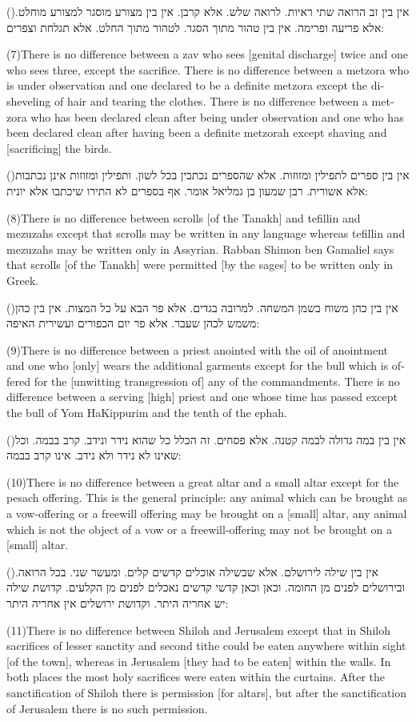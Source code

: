 \documentclass[12pt, openany]{book}
\newcommand{\sethebfont}{
\fontsize{10.5pt}{13.1pt} \selectfont
}
\newcommand{\hebeng}[2]{
	{\sethebfont #1\\}
	
	\begin{english}
		#2
	\end{english}
	\clearpage
}
\newcommand{\vsnum}[1]{(\hebrewnumeral{#1})\space}
\newcommand{\vsnumeng}[1]{(#1)\space}
\begin{document}
\hebeng{\vsnum{7}אין בין זב הרואה שתי ראיות. לרואה שלש. אלא קרבן. אין בין מצורע מוסגר למצורע מוחלט. אלא פריעה ופרימה. אין בין טהור מתוך הסגר. לטהור מתוך החלט. אלא תגלחת וצפרים: 
}{\vsnumeng{7}There is no difference between a zav who sees {[genital discharge]} twice and one who sees three, except the sacrifice. There is no difference between a metzora who is under observation and one declared to be a definite metzora except the disheveling of hair and tearing the clothes. There is no difference between a metzora who has been declared clean after being under observation and one who has been declared clean after having been a definite metzorah except shaving and {[sacrificing]} the birds.}%

\hebeng{\vsnum{8}אין בין ספרים לתפילין ומזוזות. אלא שהספרים נכתבין בכל לשון. ותפילין ומזוזות אינן נכתבות אלא אשורית. רבן שמעון בן גמליאל אומר. אף בספרים לא התירו שיכתבו אלא יונית: 
}{\vsnumeng{8}There is no difference between scrolls {[of the Tanakh]} and tefillin and mezuzahs except that scrolls may be written in any language whereas tefillin and mezuzahs may be written only in Assyrian. Rabban Shimon ben Gamaliel says that scrolls {[of the Tanakh]} were permitted {[by the sages]} to be written only in Greek.}%

\hebeng{\vsnum{9}אין בין כהן משוח בשמן המשחה. למרובה בגדים. אלא פר הבא על כל המצות. אין בין כהן משמש לכהן שעבר. אלא פר יום הכפורים ועשירית האיפה: 
}{\vsnumeng{9}There is no difference between a priest anointed with the oil of anointment and one who {[only]} wears the additional garments except for the bull which is offered for the {[unwitting transgression of]} any of the commandments. There is no difference between a serving {[high]} priest and one whose time has passed except the bull of Yom HaKippurim and the tenth of the ephah.}%

\hebeng{\vsnum{10}אין בין במה גדולה לבמה קטנה. אלא פסחים. זה הכלל כל שהוא נידר ונידב. קרב בבמה. וכל שאינו לא נידר ולא נידב. אינו קרב בבמה: 
}{\vsnumeng{10}There is no difference between a great altar and a small altar except for the pesach offering. This is the general principle: any animal which can be brought as a vow-offering or a freewill offering may be brought on a {[small]} altar, any animal which is not the object of a vow or a freewill-offering may not be brought on a {[small]} altar.}%

\hebeng{\vsnum{11}אין בין שילה לירושלם. אלא שבשילה אוכלים קדשים קלים. ומעשר שני. בכל הרואה. ובירושלים לפנים מן החומה. וכאן וכאן קדשי קדשים נאכלים לפנים מן הקלעים. קדושת שילה יש אחריה היתר. וקדושת ירושלים אין אחריה היתר: 
}{\vsnumeng{11}There is no difference between Shiloh and Jerusalem except that in Shiloh sacrifices of lesser sanctity and second tithe could be eaten anywhere within sight {[of the town]}, whereas in Jerusalem {[they had to be eaten]} within the walls. In both places the most holy sacrifices were eaten within the curtains. After the sanctification of Shiloh there is permission {[for altars]}, but after the sanctification of Jerusalem there is no such permission.}%
\end{document}
